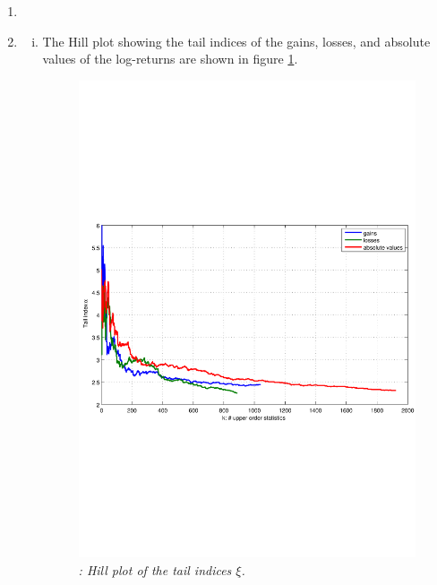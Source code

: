 \documentclass{report}
\begin{document}
\begin{enumerate}[1.]
\begin{enumerate}{(a)}
  \item
  \item 
    \begin{enumerate}[(i)]
    \item The Hill plot showing the tail indices of the gains,
      losses, and absolute values of the log-returns are shown in
      figure \ref{fig:Hill-TailIndices}.
      \begin{figure}[htb!]
        \centering
        \includegraphics[scale=0.6, clip=true, trim=0 240 0
        194]{Hill-TailIndices.pdf}
        \caption{\small \it: Hill plot of the tail indices $\xi$.}
        \label{fig:Hill-TailIndices}
      \end{figure}
      

\end{enumerate}
\end{enumerate}
\end{enumerate}
\end{document}
